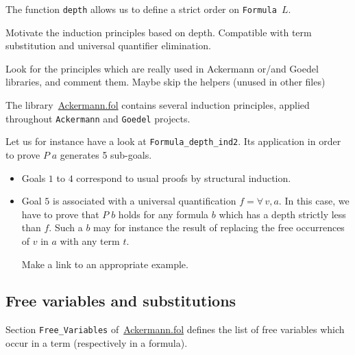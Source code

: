 The function \texttt{depth} allows us to define a strict order on 
\texttt{Formula $L$}.



\begin{todo}
Motivate the induction principles based on depth. Compatible with term substitution and universal quantifier elimination.
\end{todo}




\begin{todo}
 Look for the principles which are really used in Ackermann or/and Goedel libraries, and comment them.
 Maybe skip the helpers (unused in other files)
\end{todo}

The library~\href{../theories/html/hydras.Ackermann.fol.html}{Ackermann.fol} contains several induction principles, applied 
throughout \texttt{Ackermann} and \texttt{Goedel} projects.


Let us for instance have a look  at \texttt{Formula\_depth\_ind2}. Its application in order to prove $P\;a$ generates 5 sub-goals. 


\begin{itemize}
\item Goals $1$ to $4$ correspond to  usual proofs by structural induction.
\item Goal $5$ is associated with a universal quantification $f=\forall\,v,a$. In this case, we have to prove that $P\;b$ holds for any formula $b$ which has a depth strictly less than $f$. Such a $b$ may for instance the result of replacing the free occurrences of $v$ in $a$ with any term $t$.
  \begin{todo}
   Make a link to an appropriate example.
  \end{todo}
\end{itemize}



\subsection{Free variables and substitutions}

Section \texttt{Free\_Variables} 
of~\href{../theories/html/hydras.Ackermann.fol.html}{Ackermann.fol} defines the list of free variables which occur in a term (respectively in a formula).

